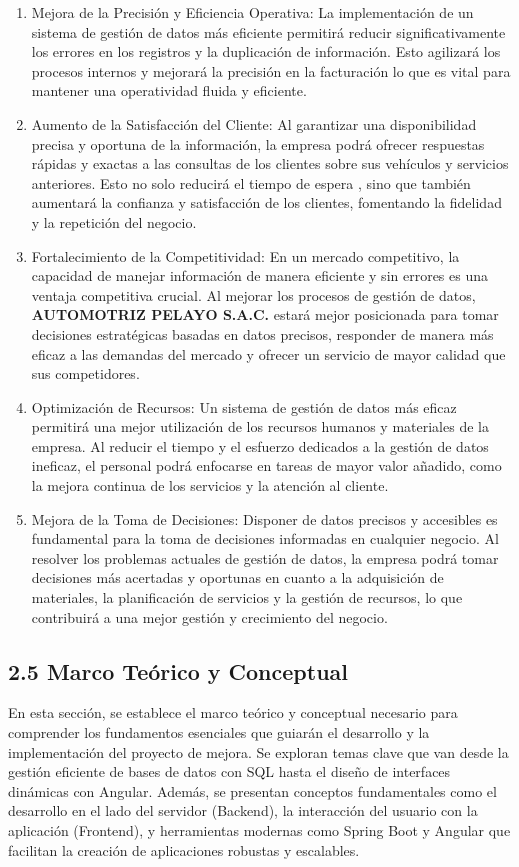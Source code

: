 \begin{enumerate}
    \item Mejora de la Precisión y Eficiencia Operativa: La implementación de un sistema de gestión de datos más eficiente permitirá reducir significativamente los errores en los registros y la duplicación de información. Esto agilizará los procesos internos y mejorará la precisión en la facturación lo que es vital para mantener una operatividad fluida y eficiente.
    \item Aumento de la Satisfacción del Cliente: Al garantizar una disponibilidad precisa y oportuna de la información, la empresa podrá ofrecer respuestas rápidas y exactas a las consultas de los clientes sobre sus vehículos y servicios anteriores. Esto no solo reducirá el tiempo de espera , sino que también aumentará la confianza y satisfacción de los clientes, fomentando la fidelidad y la repetición del negocio.
    \item Fortalecimiento de la Competitividad: En un mercado competitivo, la capacidad de manejar información de manera eficiente y sin errores es una ventaja competitiva crucial. Al mejorar los procesos de gestión de datos, \textbf{AUTOMOTRIZ PELAYO S.A.C.} estará mejor posicionada para tomar decisiones estratégicas basadas en datos precisos, responder de manera más eficaz a las demandas del mercado y ofrecer un servicio de mayor calidad que sus competidores.
    \item Optimización de Recursos: Un sistema de gestión de datos más eficaz permitirá una mejor utilización de los recursos humanos y materiales de la empresa. Al reducir el tiempo y el esfuerzo dedicados a la gestión de datos ineficaz, el personal podrá enfocarse en tareas de mayor valor añadido, como la mejora continua de los servicios y la atención al cliente.
    \item Mejora de la Toma de Decisiones: Disponer de datos precisos y accesibles es fundamental para la toma de decisiones informadas en cualquier negocio. Al resolver los problemas actuales de gestión de datos, la empresa podrá tomar decisiones más acertadas y oportunas en cuanto a la adquisición de materiales, la planificación de servicios y la gestión de recursos, lo que contribuirá a una mejor gestión y crecimiento del negocio.
\end{enumerate}


\subsection{2.5 Marco Teórico y Conceptual}
En esta sección, se establece el marco teórico y conceptual necesario para comprender los fundamentos esenciales que guiarán el desarrollo y la implementación del proyecto de mejora. Se exploran temas clave que van desde la gestión eficiente de bases de datos con SQL hasta el diseño de interfaces dinámicas con Angular. Además, se presentan conceptos fundamentales como el desarrollo en el lado del servidor (Backend), la interacción del usuario con la aplicación (Frontend), y herramientas modernas como Spring Boot y Angular que facilitan la creación de aplicaciones robustas y escalables.

